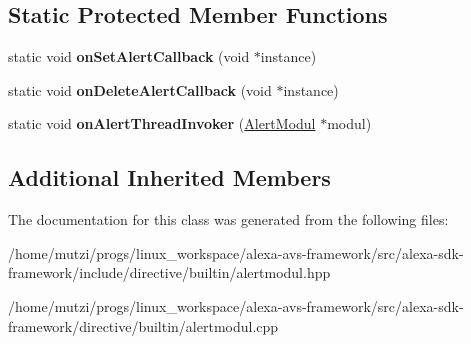 \subsection*{Static Protected Member Functions}
\begin{DoxyCompactItemize}
\item 
\mbox{\label{classdirective_1_1AlertModul_a7aa2623614b83defefc0697877ee3f19}} 
static void {\bfseries on\+Set\+Alert\+Callback} (void $\ast$instance)
\item 
\mbox{\label{classdirective_1_1AlertModul_a2e43bf2f6365e96639b76d1b0d81e55d}} 
static void {\bfseries on\+Delete\+Alert\+Callback} (void $\ast$instance)
\item 
\mbox{\label{classdirective_1_1AlertModul_aae5796949d0100ba747158d0470fd100}} 
static void {\bfseries on\+Alert\+Thread\+Invoker} (\hyperlink{classdirective_1_1AlertModul}{Alert\+Modul} $\ast$modul)
\end{DoxyCompactItemize}
\subsection*{Additional Inherited Members}


The documentation for this class was generated from the following files\+:\begin{DoxyCompactItemize}
\item 
/home/mutzi/progs/linux\+\_\+workspace/alexa-\/avs-\/framework/src/alexa-\/sdk-\/framework/include/directive/builtin/alertmodul.\+hpp\item 
/home/mutzi/progs/linux\+\_\+workspace/alexa-\/avs-\/framework/src/alexa-\/sdk-\/framework/directive/builtin/alertmodul.\+cpp\end{DoxyCompactItemize}
